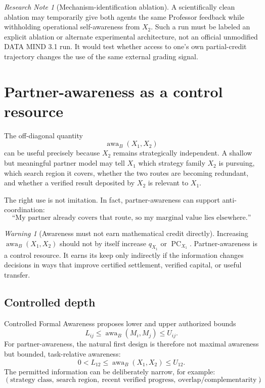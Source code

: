 \documentclass[11pt]{article}
\theoremstyle{definition}
\theoremstyle{remark}
\newtheorem{researchnote}[theorem]{Research Note}
\newtheorem{warningnote}[theorem]{Warning}
\newcommand{\PC}{\operatorname{PC}}
\newcommand{\awa}{\operatorname{awa}}
\begin{document}
\begin{researchnote}[Mechanism-identification ablation]
A scientifically clean ablation may temporarily give both agents the same Professor feedback while withholding operational self-awareness from $X_2$. Such a run must be labeled an explicit ablation or alternate experimental architecture, not an official unmodified DATA MIND 3.1 run. It would test whether access to one's own partial-credit trajectory changes the use of the same external grading signal.
\end{researchnote}

\section{Partner-awareness as a control resource}

The off-diagonal quantity
\[
\awa_B(X_1,X_2)
\]
can be useful precisely because $X_2$ remains strategically independent. A shallow but meaningful partner model may tell $X_1$ which strategy family $X_2$ is pursuing, which search region it covers, whether the two routes are becoming redundant, and whether a verified result deposited by $X_2$ is relevant to $X_1$.

The right use is not imitation. In fact, partner-awareness can support anti-coordination:
\[
\boxed{
\text{``My partner already covers that route, so my marginal value lies elsewhere.''}
}
\]

\begin{warningnote}[Awareness must not earn mathematical credit directly]
Increasing $\awa_B(X_1,X_2)$ should not by itself increase $q_{X_1}$ or $\PC_{X_1}$. Partner-awareness is a control resource. It earns its keep only indirectly if the information changes decisions in ways that improve certified settlement, verified capital, or useful transfer.
\end{warningnote}

\subsection{Controlled depth}

Controlled Formal Awareness proposes lower and upper authorized bounds
\[
L_{ij}\le \awa_B(M_i,M_j)\le U_{ij}.
\]
For partner-awareness, the natural first design is therefore not maximal awareness but bounded, task-relative awareness:
\[
0<L_{12}\le \awa_B(X_1,X_2)\le U_{12}.
\]
The permitted information can be deliberately narrow, for example:
\[
(\text{strategy class},\ \text{search region},\ \text{recent verified progress},\ \text{overlap/complementarity}).
\]
\end{document}
